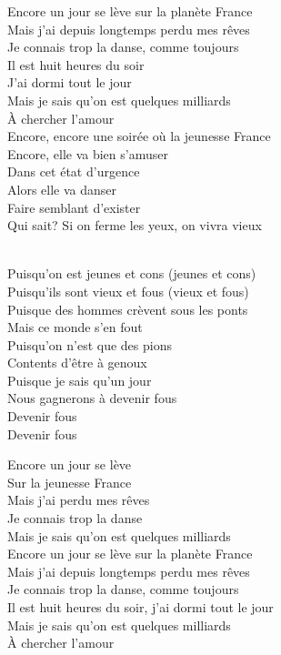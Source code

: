 \documentclass{novel}
\begin{document}
\begin{multicols}{2}
Encore un jour se lève sur la planète France \\
Mais j'ai depuis longtemps perdu mes rêves \\
Je connais trop la danse, comme toujours \\
Il est huit heures du soir \\
J'ai dormi tout le jour \\
Mais je sais qu'on est quelques milliards \\
À chercher l'amour \\

Encore, encore une soirée où la jeunesse France \\
Encore, elle va bien s'amuser \\
Dans cet état d'urgence \\
Alors elle va danser \\
Faire semblant d'exister \\
Qui sait? Si on ferme les yeux, on vivra vieux \\

\begin{bfseries}
[Refrain:]\\
Puisqu'on est jeunes et cons (jeunes et cons) \\
Puisqu'ils sont vieux et fous (vieux et fous) \\
Puisque des hommes crèvent sous les ponts \\
Mais ce monde s'en fout \\
Puisqu'on n'est que des pions \\
Contents d'être à genoux \\
Puisque je sais qu'un jour \\
Nous gagnerons à devenir fous \\
Devenir fous \\
Devenir fous \\
\end{bfseries}

Encore un jour se lève \\
Sur la jeunesse France \\
Mais j'ai perdu mes rêves \\
Je connais trop la danse \\
Mais je sais qu'on est quelques milliards \\

Encore un jour se lève sur la planète France \\
Mais j'ai depuis longtemps perdu mes rêves \\
Je connais trop la danse, comme toujours \\
Il est huit heures du soir, j'ai dormi tout le jour \\
Mais je sais qu'on est quelques milliards \\
À chercher l'amour
\end{multicols}
\end{document}
